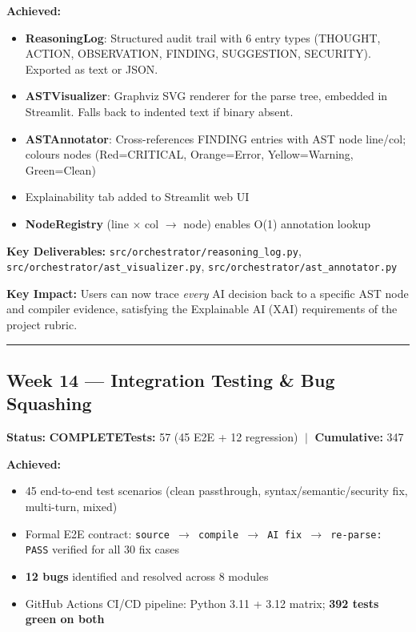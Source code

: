 \documentclass[a4paper,11pt]{article}
\newcommand{\done}{\colorbox{green!25}{\textbf{\small COMPLETE}}}
\begin{document}
\textbf{Achieved:}
\begin{itemize}[leftmargin=*, itemsep=1pt]
    \item \textbf{ReasoningLog}: Structured audit trail with 6 entry types (THOUGHT, ACTION, OBSERVATION, FINDING, SUGGESTION, SECURITY). Exported as text or JSON.
    \item \textbf{ASTVisualizer}: Graphviz SVG renderer for the parse tree, embedded in Streamlit. Falls back to indented text if binary absent.
    \item \textbf{ASTAnnotator}: Cross-references FINDING entries with AST node line/col; colours nodes (Red=CRITICAL, Orange=Error, Yellow=Warning, Green=Clean)
    \item Explainability tab added to Streamlit web UI
    \item \textbf{NodeRegistry} (line $\times$ col $\to$ node) enables O(1) annotation lookup
\end{itemize}

\textbf{Key Deliverables:} \texttt{src/orchestrator/reasoning\_log.py}, \texttt{src/orchestrator/ast\_visualizer.py}, \texttt{src/orchestrator/ast\_annotator.py}

\textbf{Key Impact:} Users can now trace \textit{every} AI decision back to a specific AST node and compiler evidence, satisfying the Explainable AI (XAI) requirements of the project rubric.

\vspace{4pt}\hrule\vspace{6pt}

\subsection{Week 14 --- Integration Testing \& Bug Squashing}

\textbf{Status:} \done \hfill \textbf{Tests:} 57 (45 E2E + 12 regression) $\;|\;$ \textbf{Cumulative:} 347

\textbf{Achieved:}
\begin{itemize}[leftmargin=*, itemsep=1pt]
    \item 45 end-to-end test scenarios (clean passthrough, syntax/semantic/security fix, multi-turn, mixed)
    \item Formal E2E contract: \texttt{source $\to$ compile $\to$ AI fix $\to$ re-parse: PASS} verified for all 30 fix cases
    \item \textbf{12 bugs} identified and resolved across 8 modules
    \item GitHub Actions CI/CD pipeline: Python 3.11 + 3.12 matrix; \textbf{392 tests green on both}
\end{itemize}
\end{document}
